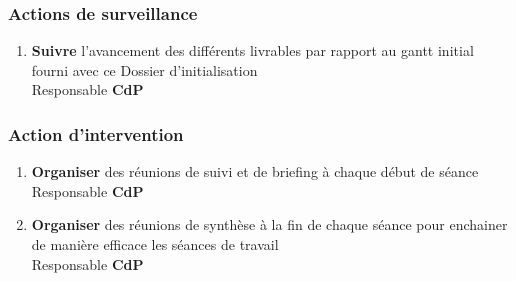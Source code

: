 \subsubsection{Actions de surveillance}

\begin{enumerate}
\item {\bf Suivre} l'avancement des différents livrables par rapport au gantt initial fourni avec ce Dossier d'initialisation \\ Responsable {\bf CdP}
\end{enumerate}

\subsubsection{Action d'intervention}

\begin{enumerate}
\item {\bf Organiser} des réunions de suivi et de briefing à chaque début de séance \\ Responsable {\bf CdP}
\item {\bf Organiser} des réunions de synthèse à la fin de chaque séance pour enchainer de manière efficace les séances de travail \\ Responsable {\bf CdP}
\end{enumerate}
